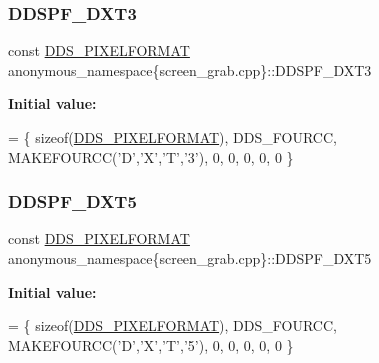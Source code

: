 \subsubsection{\texorpdfstring{D\+D\+S\+P\+F\+\_\+\+D\+X\+T3}{DDSPF\_DXT3}}
{\footnotesize\ttfamily const \mbox{\hyperlink{structanonymous__namespace_02screen__grab_8cpp_03_1_1_d_d_s___p_i_x_e_l_f_o_r_m_a_t}{D\+D\+S\+\_\+\+P\+I\+X\+E\+L\+F\+O\+R\+M\+AT}} anonymous\+\_\+namespace\{screen\+\_\+grab.\+cpp\}\+::D\+D\+S\+P\+F\+\_\+\+D\+X\+T3}

{\bfseries Initial value\+:}
\begin{DoxyCode}
=
        \{ \textcolor{keyword}{sizeof}(\mbox{\hyperlink{struct_d_d_s___p_i_x_e_l_f_o_r_m_a_t}{DDS\_PIXELFORMAT}}), DDS\_FOURCC, MAKEFOURCC(\textcolor{charliteral}{'D'},\textcolor{charliteral}{'X'},\textcolor{charliteral}{'T'},\textcolor{charliteral}{'3'}), 0, 0, 0, 0, 0 \}
\end{DoxyCode}
\mbox{\label{namespaceanonymous__namespace_02screen__grab_8cpp_03_a1b58f7e3063382cc1dff94cae1e5dca8}} 
\subsubsection{\texorpdfstring{D\+D\+S\+P\+F\+\_\+\+D\+X\+T5}{DDSPF\_DXT5}}
{\footnotesize\ttfamily const \mbox{\hyperlink{structanonymous__namespace_02screen__grab_8cpp_03_1_1_d_d_s___p_i_x_e_l_f_o_r_m_a_t}{D\+D\+S\+\_\+\+P\+I\+X\+E\+L\+F\+O\+R\+M\+AT}} anonymous\+\_\+namespace\{screen\+\_\+grab.\+cpp\}\+::D\+D\+S\+P\+F\+\_\+\+D\+X\+T5}

{\bfseries Initial value\+:}
\begin{DoxyCode}
=
        \{ \textcolor{keyword}{sizeof}(\mbox{\hyperlink{struct_d_d_s___p_i_x_e_l_f_o_r_m_a_t}{DDS\_PIXELFORMAT}}), DDS\_FOURCC, MAKEFOURCC(\textcolor{charliteral}{'D'},\textcolor{charliteral}{'X'},\textcolor{charliteral}{'T'},\textcolor{charliteral}{'5'}), 0, 0, 0, 0, 0 \}
\end{DoxyCode}
\mbox{\label{namespaceanonymous__namespace_02screen__grab_8cpp_03_a964801926f076b7071131ed0bdd7157d}} 
